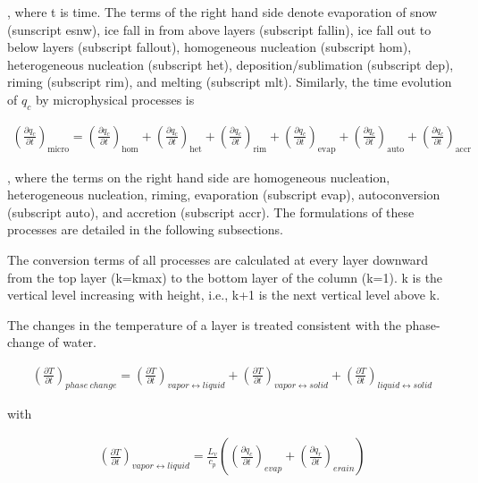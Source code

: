 , where t is time. The terms of the right hand side denote evaporation
of snow (sunscript esnw), ice fall in from above layers (subscript
fallin), ice fall out to below layers (subscript fallout), homogeneous
nucleation (subscript hom), heterogeneous nucleation (subscript het),
deposition/sublimation (subscript dep), riming (subscript rim), and
melting (subscript mlt). Similarly, the time evolution of \(q_c\) by
microphysical processes is

\begin{eqnarray}
\left(\frac{\partial q_c}{\partial t}\right)_{\text {micro}}
=\left(\frac{\partial q_c}{\partial t}\right)_{\text {hom}}
+\left(\frac{\partial q_c}{\partial t}\right)_{\text {het}}
+\left(\frac{\partial q_c}{\partial t}\right)_{\text {rim}}
+\left(\frac{\partial q_c}{\partial t}\right)_{\text {evap}}
+\left(\frac{\partial q_c}{\partial t}\right)_{\text {auto}}
+\left(\frac{\partial q_c}{\partial t}\right)_{\text {accr}}
\end{eqnarray}

, where the terms on the right hand side are homogeneous nucleation,
heterogeneous nucleation, riming, evaporation (subscript evap),
autoconversion (subscript auto), and accretion (subscript accr). The
formulations of these processes are detailed in the following
subsections.

The conversion terms of all processes are calculated at every layer
downward from the top layer (k=kmax) to the bottom layer of the column
(k=1). k is the vertical level increasing with height, i.e., k+1 is the
next vertical level above k.

The changes in the temperature of a layer is treated consistent with the
phase-change of water.

\begin{eqnarray}
\left(\frac{\partial T}{\partial t}\right)_{phase~change}=\left(\frac{\partial T}{\partial t}\right)_{vapor \leftrightarrow liquid}+\left(\frac{\partial T}{\partial t}\right)_{vapor \leftrightarrow solid}+\left(\frac{\partial T}{\partial t}\right)_{liquid \leftrightarrow solid}
\end{eqnarray}

with

\begin{eqnarray}
\left(\frac{\partial T}{\partial t}\right)_{vapor \leftrightarrow liquid}
=\frac{L_{v}}{c_{p}}\left(
\left(\frac{\partial q_c}{\partial t}\right)_{evap}
+\left(\frac{\partial q_r}{\partial t}\right)_{erain}
\right)
\end{eqnarray}

